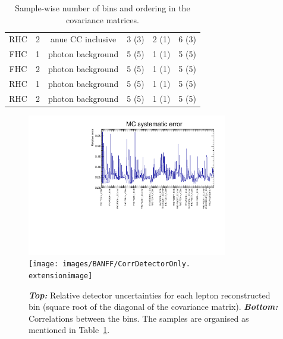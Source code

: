 \begin{table}
\begin{adjustbox}{center}
\begin{tabular}{cccccc}
      \Gls{RHC}                     & 2                          & \Gls{anue} \Gls{CC} inclusive &  3 (3)    &  2  (1)       &   6  (3)         \\ 
      \Gls{FHC}                     & 1                          & photon background             &  5 (5)    &  1  (1)       &   5  (5)         \\ 
      \Gls{FHC}                     & 2                          & photon background             &  5 (5)    &  1  (1)       &   5  (5)         \\ 
      \Gls{RHC}                     & 1                          & photon background             &  5 (5)    &  1  (1)       &   5  (5)         \\ 
      \Gls{RHC}                     & 2                          & photon background             &  5 (5)    &  1  (1)       &   5  (5)         \\
      \bottomrule
    \end{tabular}
  \end{adjustbox}
  \caption[Number of bins and ordering in the covariance
  matrices]{Sample-wise number of bins and ordering in the covariance
    matrices.}
  \label{tab:samples}
\end{table}    

\begin{figure}[ht]
  \begin{center}
    \includegraphics[width=0.78\textwidth]{images/BANFF/mc_sys_error_redu.pdf} \\
    \texttt{[image: images/BANFF/CorrDetectorOnly.\\extensionimage]}
    \caption[Relative detector uncertainties and correlations for the
    lepton reconstructed bins]{\textbf{\textit{Top:}} Relative
      detector uncertainties for each lepton reconstructed bin (square
      root of the diagonal of the covariance matrix).
      \textbf{\textit{Bottom:}} Correlations between the bins. The
      samples are organised as mentioned in Table~\ref{tab:samples}.}
    \label{fig:ndcov}
  \end{center}
\end{figure}

